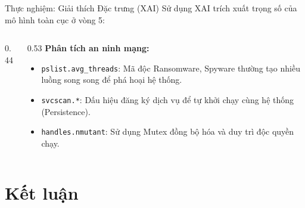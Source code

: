\documentclass[10pt]{beamer}
\begin{document}
\begin{frame}{Thực nghiệm: Giải thích Đặc trưng (XAI)}
    Sử dụng XAI trích xuất trọng số của mô hình toàn cục ở vòng 5:
    \begin{columns}[onlytextwidth]
        \begin{column}{0.44\textwidth}
            \begin{table}
                \centering
                \caption{Top đặc trưng quan trọng}
            \end{table}
        \end{column}
        \begin{column}{0.53\textwidth}
            \textbf{Phân tích an ninh mạng:}
            \begin{itemize}
                \item \texttt{pslist.avg\_threads}: Mã độc Ransomware, Spyware thường tạo nhiều luồng song song để phá hoại hệ thống.
                \item \texttt{svcscan.*}: Dấu hiệu đăng ký dịch vụ để tự khởi chạy cùng hệ thống (Persistence).
                \item \texttt{handles.nmutant}: Sử dụng Mutex đồng bộ hóa và duy trì độc quyền chạy.
            \end{itemize}
        \end{column}
    \end{columns}
\end{frame}

\section{Kết luận}
\end{document}
